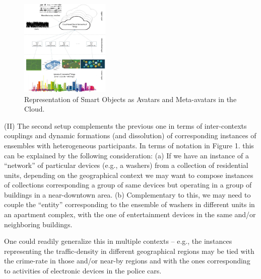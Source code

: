 \begin{figure} \vspace{-3mm}
	\centerline{\includegraphics[width=0.38\textwidth]{./fig2-3.jpg}}
	\vspace{-3mm} \caption{\small Representation of Smart Objects as Avatars and Meta-avatars in the Cloud.}
	\label{fig2}
	\vspace{-3mm}
\end{figure}

(II) The second setup complements the previous one in terms of inter-contexts couplings and dynamic formations (and dissolution) of corresponding instances of ensembles with heterogeneous participants. In terms of notation in Figure 1. this can be explained by the following consideration:
(a) If we have an instance of a ``network'' of particular devices (e.g., a washers) from a collection of residential units, depending on the geographical context we may want to compose instances of collections corresponding a group of same devices but operating in a group of buildings in a near-downtown area.
(b) Complementary to this, we may need to couple the ``entity'' corresponding to the ensemble of washers in different units in an apartment complex, with the one of entertainment devices in the same and/or neighboring buildings.


One could readily generalize this in multiple contexts -- e.g., the instances representing the traffic-density in different geographical regions may be tied with the crime-rate in those and/or near-by regions and with the ones corresponding to activities of electronic devices in the police cars. %



